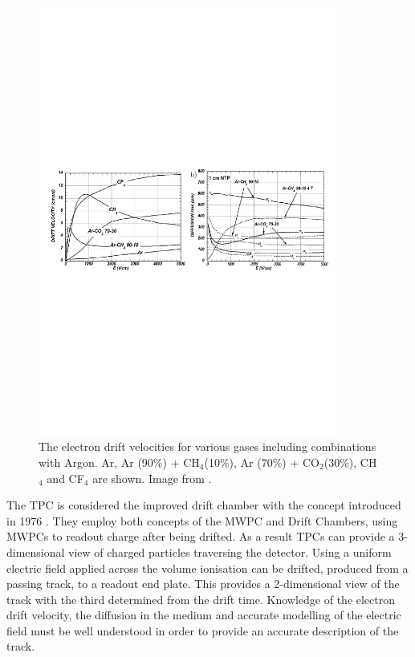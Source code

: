 \begin{figure}[htbp]
\begin{center}
	\includegraphics[width=100mm]{Chapter1/figures/driftVelocitiesArgon.pdf}
	\caption{The electron drift velocities for various gases including combinations with Argon. Ar, Ar (90\%) + CH$_{4}$(10\%), Ar (70\%) + CO$_{2}$(30\%), CH$_{4}$ and CF$_{4}$ are shown. Image from \cite{gasDetectors}.}
	\label{fig:driftVelocitiesArgon}
\end{center}
\end{figure}

The TPC is considered the improved drift chamber with the concept introduced in 1976 \cite{gasDetectors}. They employ both concepts of the MWPC and Drift Chambers, using MWPCs to readout charge after being drifted. As a result TPCs can provide a 3-dimensional view of charged particles traversing the detector. Using a uniform electric field applied across the volume ionisation can be drifted, produced from a passing track, to a readout end plate. This provides a 2-dimensional view of the track with the third determined from the drift time. Knowledge of the electron drift velocity, the diffusion in the medium and accurate modelling of the electric field must be well understood in order to provide an accurate description of the track. 

